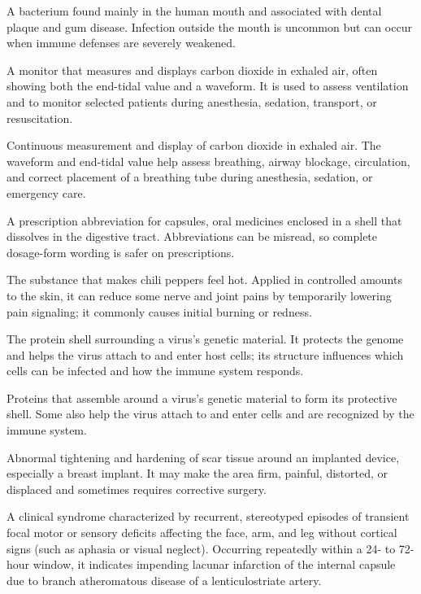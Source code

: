  A bacterium found mainly in the human mouth and associated with dental plaque and gum disease. Infection outside the mouth is uncommon but can occur when immune defenses are severely weakened.

 A monitor that measures and displays carbon dioxide in exhaled air, often showing both the end-tidal value and a waveform. It is used to assess ventilation and to monitor selected patients during anesthesia, sedation, transport, or resuscitation.

 Continuous measurement and display of carbon dioxide in exhaled air. The waveform and end-tidal value help assess breathing, airway blockage, circulation, and correct placement of a breathing tube during anesthesia, sedation, or emergency care.

 A prescription abbreviation for capsules, oral medicines enclosed in a shell that dissolves in the digestive tract. Abbreviations can be misread, so complete dosage-form wording is safer on prescriptions.

 The substance that makes chili peppers feel hot. Applied in controlled amounts to the skin, it can reduce some nerve and joint pains by temporarily lowering pain signaling; it commonly causes initial burning or redness.

 The protein shell surrounding a virus's genetic material. It protects the genome and helps the virus attach to and enter host cells; its structure influences which cells can be infected and how the immune system responds.

 Proteins that assemble around a virus's genetic material to form its protective shell. Some also help the virus attach to and enter cells and are recognized by the immune system.

 Abnormal tightening and hardening of scar tissue around an implanted device, especially a breast implant. It may make the area firm, painful, distorted, or displaced and sometimes requires corrective surgery.

 A clinical syndrome characterized by recurrent, stereotyped episodes of transient focal motor or sensory deficits affecting the face, arm, and leg without cortical signs (such as aphasia or visual neglect). Occurring repeatedly within a 24- to 72-hour window, it indicates impending lacunar infarction of the internal capsule due to branch atheromatous disease of a lenticulostriate artery.

